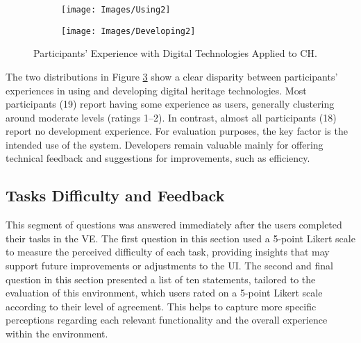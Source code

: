 \begin{figure}[h!]
  \centering
  \begin{subfigure}[b]{0.47\textwidth}
      \centering
      \texttt{[image: Images/Using2]}
      \label{fig:Using}
  \end{subfigure}
  \hfill
  \begin{subfigure}[b]{0.47\textwidth}
      \centering
      \texttt{[image: Images/Developing2]}
      \label{fig:Developing}
  \end{subfigure}
     \caption{Participants’ Experience with Digital Technologies Applied to \gls{CH}.}
     \label{fig:hertiage_techs}
\end{figure}
\FloatBarrier
The two distributions in Figure \ref{fig:hertiage_techs} show a clear disparity between participants' experiences in using and developing digital heritage technologies. Most participants (19) report having some experience as users, generally clustering around moderate levels (ratings 1–2). 
In contrast, almost all participants (18) report no development experience.
For evaluation purposes, the key factor is the intended use of the system. Developers remain valuable mainly for offering technical feedback and suggestions for improvements, such as efficiency.







\subsection{Tasks Difficulty and Feedback}

This segment of questions was answered immediately after the users completed their tasks in the \gls{VE}.
The first question in this section used a 5-point Likert scale to measure the perceived difficulty of each task, providing insights that may support future improvements or adjustments to the \gls{UI}.
The second and final question in this section presented a list of ten statements, tailored to the evaluation of this environment, which users rated on a 5-point Likert scale according to their level of agreement.
This helps to capture more specific perceptions regarding each relevant functionality and the overall experience within the environment.

